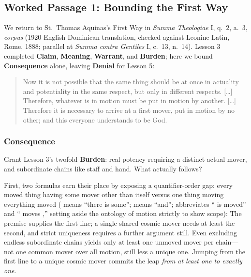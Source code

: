 \subsection{Worked Passage 1: Bounding the First Way}

We return to St.\ Thomas Aquinas's First Way in \emph{Summa Theologiae} I, q.\ 2, a.\ 3, \emph{corpus} (1920 English Dominican translation, checked against Leonine Latin, Rome, 1888; parallel at \emph{Summa contra Gentiles} I, c.\ 13, n.\ 14). Lesson 3 completed \textbf{Claim}, \textbf{Meaning}, \textbf{Warrant}, and \textbf{Burden}; here we bound \textbf{Consequence} alone, leaving \textbf{Denial} for Lesson 5:

\begin{quote}
Now it is not possible that the same thing should be at once in actuality and potentiality in the same respect, but only in different respects. [\dots] Therefore, whatever is in motion must be put in motion by another. [\dots] Therefore it is necessary to arrive at a first mover, put in motion by no other; and this everyone understands to be God.
\end{quote}

\subsubsection*{Consequence}

Grant Lesson 3's twofold \textbf{Burden}: real potency requiring a distinct actual mover, and subordinate chains like staff and hand. What actually follows?

First, two formulas earn their place by exposing a quantifier-order gap: every moved thing having some mover other than itself versus one thing moving everything moved (\linline{\lex} means ``there is some''; \linline{\landop} means ``and'';  abbreviates `` is moved'' and  `` moves ,'' setting aside the ontology of motion strictly to show scope):
The premise supplies the first line; a single shared cosmic mover needs at least the second, and strict uniqueness requires a further argument still. Even excluding endless subordinate chains yields only at least one unmoved mover per chain---not one common mover over all motion, still less a unique one. Jumping from the first line to a unique cosmic mover commits the leap \emph{from at least one to exactly one}.


